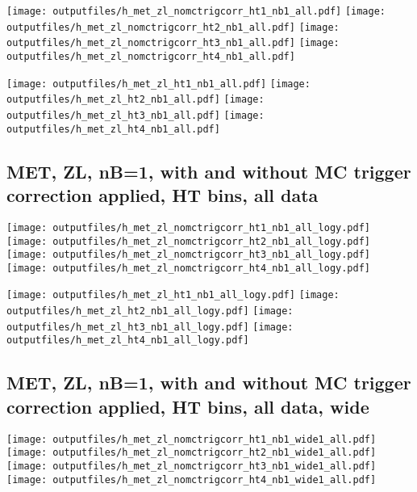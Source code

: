 \documentclass[11pt]{article}
\begin{document}
    \noindent
     \texttt{[image: outputfiles/h\_met\_zl\_nomctrigcorr\_ht1\_nb1\_all.pdf]}
     \texttt{[image: outputfiles/h\_met\_zl\_nomctrigcorr\_ht2\_nb1\_all.pdf]}
     \texttt{[image: outputfiles/h\_met\_zl\_nomctrigcorr\_ht3\_nb1\_all.pdf]}
     \texttt{[image: outputfiles/h\_met\_zl\_nomctrigcorr\_ht4\_nb1\_all.pdf]}

    \noindent
     \texttt{[image: outputfiles/h\_met\_zl\_ht1\_nb1\_all.pdf]}
     \texttt{[image: outputfiles/h\_met\_zl\_ht2\_nb1\_all.pdf]}
     \texttt{[image: outputfiles/h\_met\_zl\_ht3\_nb1\_all.pdf]}
     \texttt{[image: outputfiles/h\_met\_zl\_ht4\_nb1\_all.pdf]}

    \clearpage
     \subsection{ MET, ZL, nB=1, with and without MC trigger correction applied, HT bins, all data}

    \noindent
     \texttt{[image: outputfiles/h\_met\_zl\_nomctrigcorr\_ht1\_nb1\_all\_logy.pdf]}
     \texttt{[image: outputfiles/h\_met\_zl\_nomctrigcorr\_ht2\_nb1\_all\_logy.pdf]}
     \texttt{[image: outputfiles/h\_met\_zl\_nomctrigcorr\_ht3\_nb1\_all\_logy.pdf]}
     \texttt{[image: outputfiles/h\_met\_zl\_nomctrigcorr\_ht4\_nb1\_all\_logy.pdf]}


    \noindent
     \texttt{[image: outputfiles/h\_met\_zl\_ht1\_nb1\_all\_logy.pdf]}
     \texttt{[image: outputfiles/h\_met\_zl\_ht2\_nb1\_all\_logy.pdf]}
     \texttt{[image: outputfiles/h\_met\_zl\_ht3\_nb1\_all\_logy.pdf]}
     \texttt{[image: outputfiles/h\_met\_zl\_ht4\_nb1\_all\_logy.pdf]}


    \clearpage
     \subsection{ MET, ZL, nB=1, with and without MC trigger correction applied, HT bins, all data, wide}

    \noindent
     \texttt{[image: outputfiles/h\_met\_zl\_nomctrigcorr\_ht1\_nb1\_wide1\_all.pdf]}
     \texttt{[image: outputfiles/h\_met\_zl\_nomctrigcorr\_ht2\_nb1\_wide1\_all.pdf]}
     \texttt{[image: outputfiles/h\_met\_zl\_nomctrigcorr\_ht3\_nb1\_wide1\_all.pdf]}
     \texttt{[image: outputfiles/h\_met\_zl\_nomctrigcorr\_ht4\_nb1\_wide1\_all.pdf]}
\end{document}
